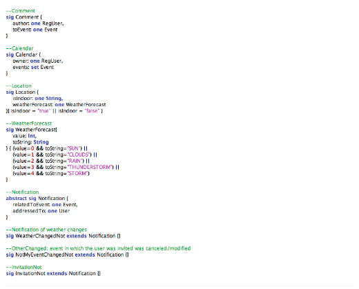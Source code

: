 \documentclass[12pt]{book}
\begin{document}
\includegraphics[width=19cm,height=21cm]{Alloy2}\\
\newpage
\end{document}
